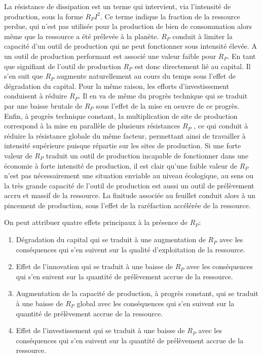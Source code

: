 \documentclass[12pt,a4paper]{article}%
\begin{document}
La résistance de dissipation est un terme qui intervient, via l'intensité de
production, sous la forme $R_{P}I^{2}$. Ce terme indique la fraction de la
ressource perdue, qui n'est pas utilisée pour la production de bien de consommation
alors même que la ressource a été prélevée à la planète. $R_{P}$
conduit à limiter la capacité d'un outil de production qui ne peut
fonctionner sous intensité élevée. A un outil de production performant est
associé une valeur faible pour $R_{P}$. En tant que signifiant de l'outil de
production $R_{P}$ est donc directement lié au capital. Il s'en suit que
$R_{P}$ augmente naturellement au cours du temps sous l'effet de dégradation
du capital. Pour la même raison, les efforts d'investissement conduisent à
réduire $R_{P}$. Il en va de même du progrès technique qui se traduit par
une baisse brutale de $R_{P}$ sous l'effet de la mise en oeuvre de ce
progrès. Enfin, à progrès technique constant, la multiplication de
site de production correspond à la mise en parallèle de plusieurs
résistances $R_{P}$ , ce qui conduit à réduire la résistance globale du
même facteur, permettant ainsi de travailler à intensité supérieure
puisque répartie sur les sites de production. Si une forte valeur de $R_{P}$
traduit un outil de production incapable de fonctionner dans une économie
à forte intensité de production, il est clair qu'une faible valeur de
$R_{P}$ n'est pas nécessairement une situation enviable au niveau écologique,
au sens o{u} la très grande capacité de l'outil de production est aussi
un outil de prélèvement accru et massif de la ressource. La finitude
associée au feuillet conduit alors à un pincement de production, sous
l'effet de la raréfaction accélérée de la ressource.

On peut attribuer quatre effets principaux à la présence de $R_{P}$:

\begin{enumerate}
\item Dégradation du capital qui se traduit à une augmentation de $R_{P}$
avec les conséquences qui s'en suivent sur la qualité d'exploitation de la ressource.

\item Effet de l'innovation qui se traduit à une baisse de $R_{P}$ avec
les conséquences qui s'en suivent sur la quantité de prélèvement accrue de
la ressource.

\item Augmentation de la capacité de production, à progrès constant,
qui se traduit à une baisse de $R_{P}$ global avec les conséquences qui
s'en suivent sur la quantité de prélèvement accrue de la ressource.

\item Effet de l'investissement qui se traduit à une baisse de $R_{P}$
avec les conséquences qui s'en suivent sur la quantité de prélèvement
accrue de la ressource.
\end{enumerate}
\end{document}

